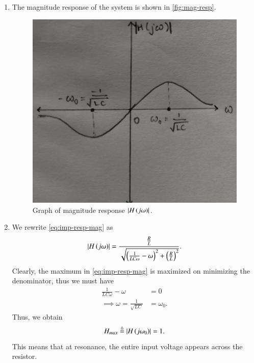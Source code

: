 \documentclass[journal,12pt,twocolumn]{IEEEtran}
\begin{document}
\begin{enumerate}[label=\theenumi.]
    \item The magnitude response of the system is shown in \autoref{fig:mag-resp}.
    \begin{figure}[!ht]
        \centering
        \includegraphics[width=\columnwidth]{figs/mag-resp.jpg}
        \caption{Graph of magnitude response \(\left\vert H\left(j\omega\right)\right\vert\).}
        \label{fig:mag-resp}
    \end{figure}

    \item We rewrite \eqref{eq:imp-resp-mag} as
    \begin{equation}
        \left\vert H\left(j\omega\right)\right\vert = \frac{\frac{R}{L}}{\sqrt{\left(\frac{1}{LC\omega}-\omega\right)^2 + \left(\frac{R}{L}\right)^2}}.
    \end{equation}
    Clearly, the maximum in \eqref{eq:imp-resp-mag} is maximized on minimizing
    the denominator, thus we must have
    \begin{align}
        \frac{1}{LC\omega} - \omega &= 0 \\
        \implies \omega = \frac{1}{\sqrt{LC}} &= \omega_0.
        \label{eq:reso-freq}
    \end{align}
    Thus, we obtain
    \begin{equation}
        H_{max} \stackrel{\triangle}{=} \left\vert H\left(j\omega_0\right)\right\vert = 1.
        \label{eq:h-max}
    \end{equation}
    This means that at resonance, the entire input voltage appears across the
    resistor.


\end{enumerate}
\end{document}
